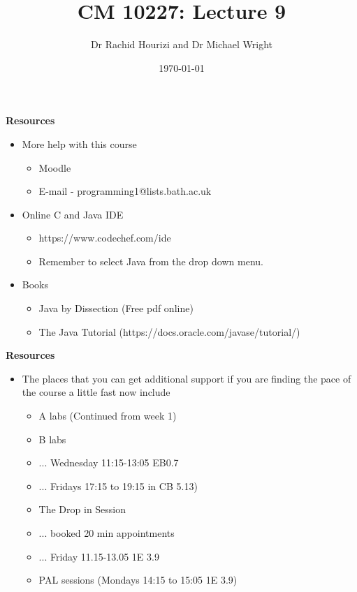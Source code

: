 \documentclass{beamer}
\begin{document}

\title{CM 10227: Lecture 9}
\author{Dr Rachid Hourizi and Dr Michael Wright}
\date{\today}
\frame{\titlepage}

\begin{frame} 
\begin{center}
\textbf{Resources}
\end{center}
\begin{itemize}
\item More help with this course
\begin{itemize}
\item Moodle
\item E-mail - programming1@lists.bath.ac.uk
\end{itemize}
\item Online C and Java IDE
\begin{itemize}
\item https://www.codechef.com/ide
\item Remember to select Java from the drop down menu.
\end{itemize}
\item Books
\begin{itemize}
\item Java by Dissection (Free pdf online)
\item The Java Tutorial (https://docs.oracle.com/javase/tutorial/)
\end{itemize}
\end{itemize}
\end{frame}

\begin{frame} 
\begin{center}
\textbf{Resources}
\end{center}
\begin{itemize}
\item The places that you can get additional support if you are finding the pace of the course a little fast now include
\begin{itemize}
\item A labs (Continued from week 1)
\item B labs 
\item ... Wednesday 11:15-13:05 EB0.7
\item ... Fridays 17:15 to 19:15 in CB 5.13)
\item The Drop in Session 
\item ... booked 20 min appointments
\item ... Friday 11.15-13.05 1E 3.9
\item PAL sessions (Mondays 14:15 to 15:05 1E 3.9)
\end{itemize}
\end{itemize}
\end{frame}
\end{document}
